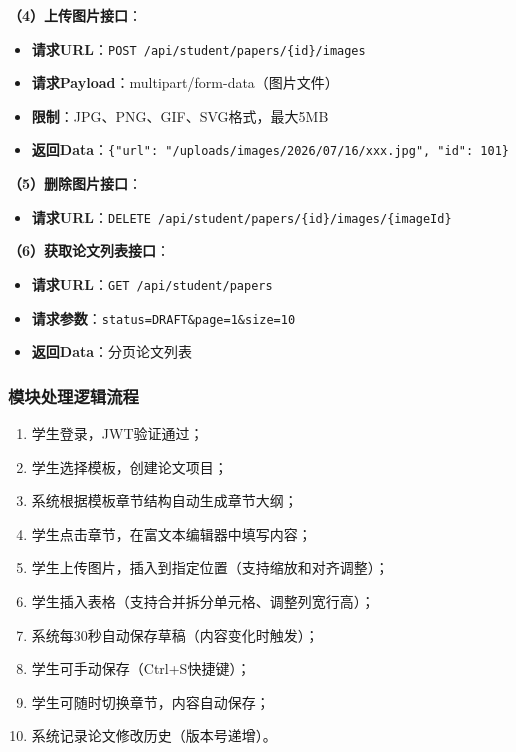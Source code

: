 \documentclass{../template/softeng}
\begin{document}
	\textbf{（4）上传图片接口}：
	\begin{itemize}
		\item \textbf{请求URL}：\texttt{POST /api/student/papers/\{id\}/images}
		\item \textbf{请求Payload}：multipart/form-data（图片文件）
		\item \textbf{限制}：JPG、PNG、GIF、SVG格式，最大5MB
		\item \textbf{返回Data}：\texttt{\{"url": "/uploads/images/2026/07/16/xxx.jpg", "id": 101\}}
	\end{itemize}

	\textbf{（5）删除图片接口}：
	\begin{itemize}
		\item \textbf{请求URL}：\texttt{DELETE /api/student/papers/\{id\}/images/\{imageId\}}
	\end{itemize}

	\textbf{（6）获取论文列表接口}：
	\begin{itemize}
		\item \textbf{请求URL}：\texttt{GET /api/student/papers}
		\item \textbf{请求参数}：\texttt{status=DRAFT\&page=1\&size=10}
		\item \textbf{返回Data}：分页论文列表
	\end{itemize}

	\subsubsection{模块处理逻辑流程}
	\begin{enumerate}
		\item 学生登录，JWT验证通过；
		\item 学生选择模板，创建论文项目；
		\item 系统根据模板章节结构自动生成章节大纲；
		\item 学生点击章节，在富文本编辑器中填写内容；
		\item 学生上传图片，插入到指定位置（支持缩放和对齐调整）；
		\item 学生插入表格（支持合并拆分单元格、调整列宽行高）；
		\item 系统每30秒自动保存草稿（内容变化时触发）；
		\item 学生可手动保存（Ctrl+S快捷键）；
		\item 学生可随时切换章节，内容自动保存；
		\item 系统记录论文修改历史（版本号递增）。
	\end{enumerate}
\end{document}
